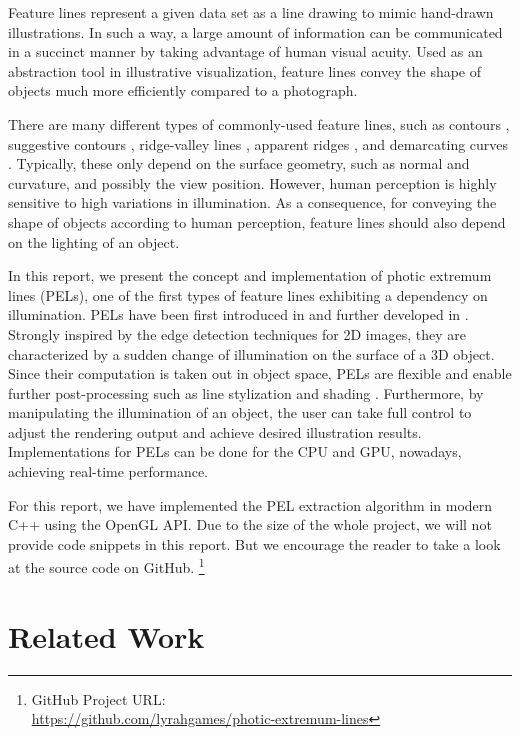 \documentclass[9pt,fleqn,twoside,twocolumn]{stdglobal}
\begin{document}
  Feature lines represent a given data set as a line drawing to mimic hand-drawn illustrations.
  In such a way, a large amount of information can be communicated in a succinct manner by taking advantage of human visual acuity.
  Used as an abstraction tool in illustrative visualization, feature lines convey the shape of objects much more efficiently compared to a photograph.
  \autocite{xie2007,isenberg2003,viola2005}

  There are many different types of commonly-used feature lines, such as contours \autocite{isenberg2003}, suggestive contours \autocite{decarlo2003}, ridge-valley lines \autocite{ohtake2004}, apparent ridges \autocite{judd2007}, and demarcating curves \autocite{kolomenkin2008}.
  Typically, these only depend on the surface geometry, such as normal and curvature, and possibly the view position.
  However, human perception is highly sensitive to high variations in illumination.
  As a consequence, for conveying the shape of objects according to human perception, feature lines should also depend on the lighting of an object.
  \autocite{xie2007,zhang2011}

  In this report, we present the concept and implementation of photic extremum lines (PELs), one of the first types of feature lines exhibiting a dependency on illumination.
  PELs have been first introduced in \textcite{xie2007} and further developed in \textcite{zhang2010}.
  Strongly inspired by the edge detection techniques for 2D images, they are characterized by a sudden change of illumination on the surface of a 3D object.
  Since their computation is taken out in object space, PELs are flexible and enable further post-processing such as line stylization and shading \autocite{isenberg2003}.
  Furthermore, by manipulating the illumination of an object, the user can take full control to adjust the rendering output and achieve desired illustration results.
  Implementations for PELs can be done for the CPU and GPU, nowadays, achieving real-time performance.
  \autocite{xie2007,zhang2010}

  For this report, we have implemented the PEL extraction algorithm in modern C++ using the OpenGL API.
  Due to the size of the whole project, we will not provide code snippets in this report.
  But we encourage the reader to take a look at the source code on GitHub.%
  \footnote{GitHub Project URL: \\ \url{https://github.com/lyrahgames/photic-extremum-lines}}

\section{Related Work}
\label{sec:related-work}
\end{document}
